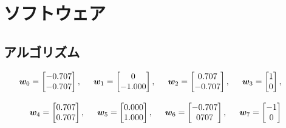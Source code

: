 \documentclass[11pt,a4paper]{jsarticle}
\begin{document}
\section{ソフトウェア} 

\subsection{アルゴリズム}

  \begin{eqnarray}
    \bm{w}_0 = \begin{bmatrix} -0.707 \\ -0.707 \end{bmatrix}, \hspace{5mm} \nonumber
    \bm{w}_1 = \begin{bmatrix}  0     \\ -1.000 \end{bmatrix}, \hspace{5mm}
    \bm{w}_2 = \begin{bmatrix}  0.707 \\ -0.707 \end{bmatrix}, \hspace{5mm}
    \bm{w}_3 = \begin{bmatrix}  1     \\  0     \end{bmatrix}, \hspace{5mm} \\[3mm]
    \bm{w}_4 = \begin{bmatrix}  0.707 \\  0.707 \end{bmatrix}, \hspace{5mm} \nonumber
    \bm{w}_5 = \begin{bmatrix}  0.000 \\  1.000 \end{bmatrix}, \hspace{5mm}
    \bm{w}_6 = \begin{bmatrix} -0.707 \\  0707  \end{bmatrix}, \hspace{5mm}
    \bm{w}_7 = \begin{bmatrix} -1     \\  0     \end{bmatrix}  \hspace{5mm}
  \end{eqnarray}
\end{document}
